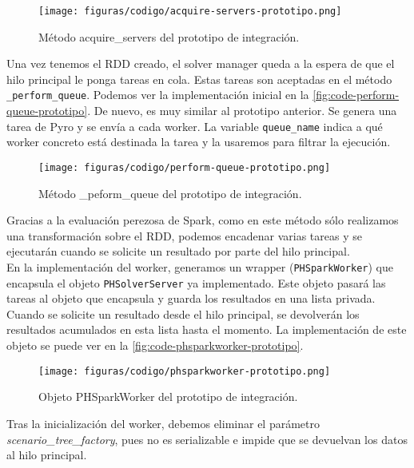 \begin{figure}[]
    \centerline{\texttt{[image: figuras/codigo/acquire-servers-prototipo.png]}}
    \caption{Método acquire\_servers del prototipo de integración.}
    \label{fig:code-acquire-servers-prototipo}
\end{figure}

Una vez tenemos el RDD creado, el solver manager queda a la espera de que el hilo principal le ponga tareas en cola. Estas tareas son aceptadas en el método \texttt{\_perform\_queue}. Podemos ver la implementación inicial en la \autoref{fig:code-perform-queue-prototipo}. De nuevo, es muy similar al prototipo anterior. Se genera una tarea de Pyro y se envía a cada worker. La variable \texttt{queue\_name} indica a qué worker concreto está destinada la tarea y la usaremos para filtrar la ejecución. \\

\begin{figure}[]
    \centerline{\texttt{[image: figuras/codigo/perform-queue-prototipo.png]}}
    \caption{Método \_peform\_queue del prototipo de integración.}
    \label{fig:code-perform-queue-prototipo}
\end{figure}

Gracias a la evaluación perezosa de Spark, como en este método sólo realizamos una transformación sobre el RDD, podemos encadenar varias tareas y se ejecutarán cuando se solicite un resultado por parte del hilo principal.\\

En la implementación del worker, generamos un wrapper (\texttt{PHSparkWorker}) que encapsula el objeto \texttt{PHSolverServer} ya implementado. Este objeto pasará las tareas al objeto que encapsula y guarda los resultados en una lista privada. Cuando se solicite un resultado desde el hilo principal, se devolverán los resultados acumulados en esta lista hasta el momento. La implementación de este objeto se puede ver en la \autoref{fig:code-phsparkworker-prototipo}.\\

\begin{figure}[]
    \centerline{\texttt{[image: figuras/codigo/phsparkworker-prototipo.png]}}
    \caption{Objeto PHSparkWorker del prototipo de integración.}
    \label{fig:code-phsparkworker-prototipo}
\end{figure}

Tras la inicialización del worker, debemos eliminar el parámetro \textit{scenario\_tree\_factory}, pues no es serializable e impide que se devuelvan los datos al hilo principal.

